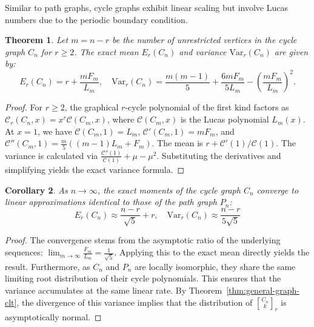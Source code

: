 \documentclass{amsart}
\newtheorem{theorem}{Theorem}[section]
\newtheorem{corollary}[theorem]{Corollary}
\theoremstyle{definition}
\begin{document}
 Similar to path graphs, cycle graphs exhibit linear scaling but involve Lucas numbers due to the periodic boundary condition.

\begin{theorem}
Let $m = n-r$ be the number of unrestricted vertices in the cycle graph $C_n$ for $r \geq 2$. The exact mean $E_r(C_n)$ and variance $\text{Var}_r(C_n)$ are given by:
\begin{equation*}
    E_r(C_n) = r + \frac{m F_{m}}{L_{m}}, \quad \text{Var}_r(C_n) = \frac{m(m-1)}{5} + \frac{6m F_m}{5 L_m} - \left( \frac{m F_m}{L_m} \right)^2.
\end{equation*}
\end{theorem}

\begin{proof}
For $r \geq 2$, the graphical $r$-cycle polynomial of the first kind factors as $\mathcal{C}_r(C_n, x) = x^r \mathcal{C}(C_m, x)$, where $\mathcal{C}(C_m, x)$ is the Lucas polynomial $L_m(x)$. At $x=1$, we have $\mathcal{C}(C_m, 1) = L_m$, $\mathcal{C}'(C_m, 1) = m F_m$, and $\mathcal{C}''(C_m, 1) = \frac{m}{5} \left( (m-1)L_m + F_m \right)$.
The mean is $r + \mathcal{C}'(1)/\mathcal{C}(1)$. The variance is calculated via $\frac{\mathcal{C}''(1)}{\mathcal{C}(1)} + \mu - \mu^2$. Substituting the derivatives and simplifying yields the exact variance formula.
\end{proof}

\begin{corollary}
As $n \to \infty$, the exact moments of the cycle graph $C_n$ converge to linear approximations identical to those of the path graph $P_n$:
    \begin{equation*}
        E_r(C_n) \approx \frac{n-r}{\sqrt{5}} + r ,\quad
        \text{Var}_r(C_n) \approx \frac{n-r}{5\sqrt{5}}
    \end{equation*}
\end{corollary}

\begin{proof}
The convergence stems from the asymptotic ratio of the underlying sequences: $\lim_{m \to \infty} \frac{F_m}{L_m} = \frac{1}{\sqrt{5}}$. Applying this to the exact mean directly yields the result. Furthermore, as $C_n$ and $P_n$ are locally isomorphic, they share the same limiting root distribution of their cycle polynomials. This ensures that the variance accumulates at the same linear rate. By Theorem~\ref{thm:general-graph-clt}, the divergence of this variance implies that the distribution of ${C_n \brack k}_r$ is asymptotically normal.
\end{proof}
\end{document}
